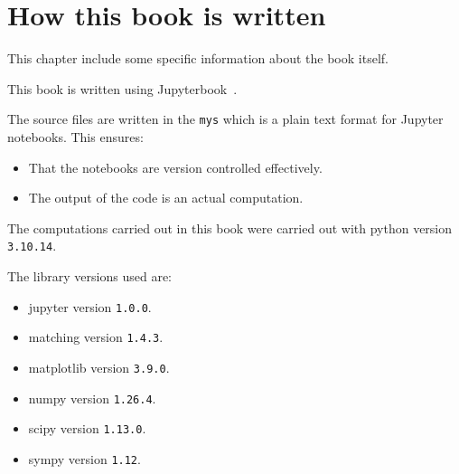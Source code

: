 \chapter{How this book is written}

This chapter include some specific information about the book itself.

This book is written using
Jupyterbook~\cite{executable_books_community_2021_4539666}.

The source files are written in the \texttt{mys} which is a plain text format for Jupyter notebooks. This ensures:

\begin{itemize}
    \item That the notebooks are version controlled effectively.
    \item The output of the code is an actual computation.
\end{itemize}

The computations carried out in this book were carried out with python version
\texttt{3.10.14}.

The library versions used are:

\begin{itemize}
    \item jupyter version \texttt{1.0.0}.
    \item matching version \texttt{1.4.3}.
    \item matplotlib version \texttt{3.9.0}.
    \item numpy version \texttt{1.26.4}.
    \item scipy version \texttt{1.13.0}.
    \item sympy version \texttt{1.12}.
\end{itemize}
